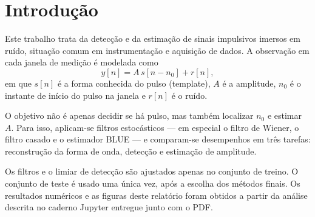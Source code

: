 \section{Introdução}

Este trabalho trata da detecção e da estimação de sinais impulsivos imersos em
ruído, situação comum em instrumentação e aquisição de dados. A observação em
cada janela de medição é modelada como
\begin{equation}
y[n] = A\, s[n - n_0] + r[n],
\end{equation}
em que \(s[n]\) é a forma conhecida do pulso (template), \(A\) é a amplitude,
\(n_0\) é o instante de início do pulso na janela e \(r[n]\) é o ruído.

O objetivo não é apenas decidir se há pulso, mas também localizar \(n_0\) e
estimar \(A\). Para isso, aplicam-se filtros estocásticos --- em especial o
filtro de Wiener, o filtro casado e o estimador BLUE --- e comparam-se
desempenhos em três tarefas: reconstrução da forma de onda, detecção e
estimação de amplitude.

Os filtros e o limiar de detecção são ajustados apenas no conjunto de treino.
O conjunto de teste é usado uma única vez, após a escolha dos métodos finais.
Os resultados numéricos e as figuras deste relatório foram obtidos a partir da
análise descrita no caderno Jupyter entregue junto com o PDF.
